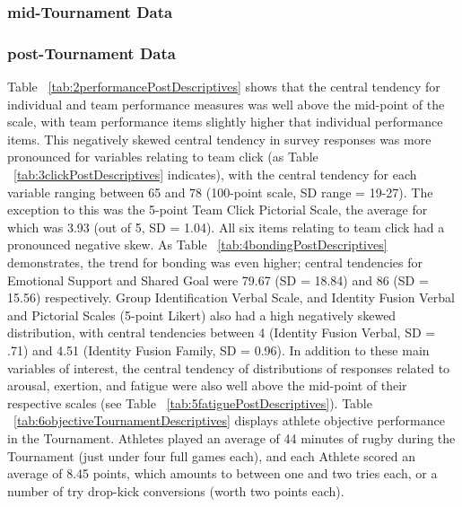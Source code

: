 \subsubsection{mid-Tournament Data}



\subsubsection{post-Tournament Data}











Table ~\ref{tab:2performancePostDescriptives} shows that the central tendency for individual and team performance measures was well above the mid-point of the scale, with team performance items slightly higher that individual performance items.  This negatively skewed central tendency in survey responses was more pronounced for variables relating to team click (as Table ~\ref{tab:3clickPostDescriptives} indicates), with the central tendency for each variable ranging between 65 and 78 (100-point scale, SD range = 19-27). The exception to this was the 5-point Team Click Pictorial Scale, the average for which was 3.93 (out of 5, SD = 1.04).  All six items relating to team click had a pronounced negative skew.  As Table ~\ref{tab:4bondingPostDescriptives} demonstrates, the trend for bonding was even higher; central tendencies for Emotional Support and Shared Goal were 79.67 (SD = 18.84) and 86 (SD = 15.56) respectively.  Group Identification Verbal Scale, and Identity Fusion Verbal and Pictorial Scales (5-point Likert) also had a high negatively skewed distribution, with central tendencies between 4 (Identity Fusion Verbal, SD = .71) and 4.51 (Identity Fusion Family, SD = 0.96).
In addition to these main variables of interest, the central tendency of distributions of responses related to arousal, exertion, and fatigue were also well above the mid-point of their respective scales (see Table ~\ref{tab:5fatiguePostDescriptives}).  Table ~\ref{tab:6objectiveTournamentDescriptives} displays athlete objective performance in the Tournament. Athletes played an average of 44 minutes of rugby during the Tournament (just under four full games each), and each Athlete scored an average of 8.45 points, which amounts to between one and two tries each, or a number of try drop-kick conversions (worth two points each).





